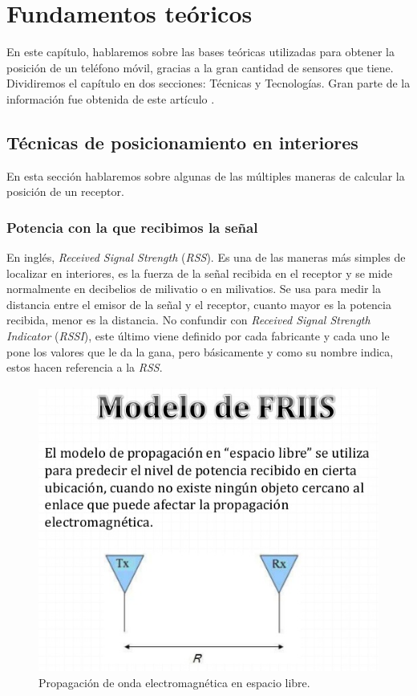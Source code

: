 \chapter{Fundamentos teóricos}
En este capítulo, hablaremos sobre las bases teóricas utilizadas para obtener la posición de un teléfono móvil, gracias a la gran cantidad de sensores que tiene. Dividiremos el capítulo en dos secciones: Técnicas y Tecnologías. Gran parte de la información fue obtenida de este artículo \cite{mohamad_yassin_elias_rachid_survey_2015}.

\section{Técnicas de posicionamiento en interiores} \label{tecnicas}
En esta sección hablaremos sobre algunas de las múltiples maneras de calcular la posición de un receptor.

\subsection{Potencia con la que recibimos la señal} \label{rssi}
En inglés, \textit{Received Signal Strength} (\textit{RSS}). Es una de las maneras más simples de localizar en interiores, es la fuerza de la señal recibida en el receptor y se mide normalmente en decibelios de milivatio o en milivatios. Se usa para medir la distancia entre el emisor de la señal y el receptor, cuanto mayor es la potencia recibida, menor es la distancia. No confundir con \textit{Received Signal Strength Indicator} (\textit{RSSI}), este último viene definido por cada fabricante y cada uno le pone los valores que le da la gana, pero básicamente y como su nombre indica, estos hacen referencia a la \textit{RSS}.

\begin{figure}[t]
\centering
\includegraphics[scale=0.4]{figures/friis.png}
\caption{Propagación de onda electromagnética en espacio libre.\label{fig:friis}}
\end{figure}

